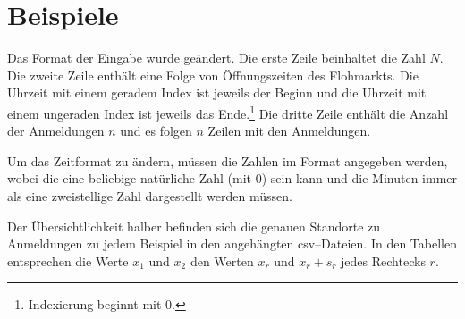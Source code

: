 \section{Beispiele}
Das Format der Eingabe wurde geändert. 
Die erste Zeile beinhaltet die Zahl $N$.
Die zweite Zeile enthält eine Folge von Öffnungszeiten des Flohmarkts.
Die Uhrzeit mit einem geradem Index ist jeweils der Beginn und die Uhrzeit 
mit einem ungeraden Index ist jeweils das Ende.\footnote{Indexierung beginnt mit 0.}
Die dritte Zeile enthält die Anzahl der Anmeldungen $n$ und es folgen $n$ Zeilen mit den Anmeldungen.

Um das Zeitformat zu ändern, müssen die Zahlen im Format  angegeben werden, wobei 
die  eine beliebige natürliche Zahl (mit 0) sein kann und
die Minuten  immer als eine zweistellige Zahl dargestellt werden müssen.

Der Übersichtlichkeit halber befinden sich die genauen Standorte zu Anmeldungen
zu jedem Beispiel in den angehängten csv--Dateien.
In den Tabellen entsprechen die Werte $x_1$ und $x_2$ den Werten 
$x_r$ und $x_r + s_r$ jedes Rechtecks $r$.












